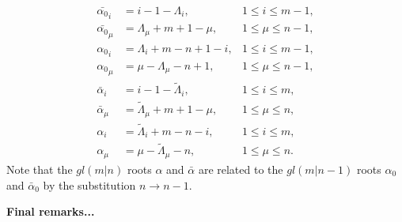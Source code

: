 \documentclass[12pt]{article}
\begin{document}
\begin{align*}
{\bar{\alpha_0}}_i &= i - 1 -\Lambda_i  , &1\leq i\leq m-1, \\
{\bar{\alpha_0}}_\mu &= \Lambda_\mu + m + 1 - \mu  ,  &1\leq \mu \leq n-1 , \\ 
{\alpha_0}_i &= \Lambda_i + m - n + 1 - i  , &1\leq i\leq m-1, \\
{\alpha_0}_\mu &= \mu - \Lambda_\mu -n + 1, &1\leq \mu \leq n-1 , \\
\bar{\alpha}_i  &= i - 1 -{\tilde{\Lambda}}_i , &1\leq i\leq m, \\
\bar{\alpha}_\mu &= {\tilde{\Lambda}}_\mu + m + 1 - \mu,  &1\leq \mu \leq n , \\
\alpha_i &= {\tilde{\Lambda}}_i + m - n - i, &1\leq i\leq m, \\
\alpha_\mu &= \mu-{\tilde{\Lambda}}_\mu - n, &1\leq \mu \leq n .  
\end{align*}
Note that the $gl(m|n)$ roots $\alpha$ and $\bar{\alpha}$ are related to the $gl(m|n-1)$ roots $\alpha_0$ and $\bar{\alpha}_0$ by the substitution $n \rightarrow n - 1$.

{\bf Final remarks...}




%
\end{document}
